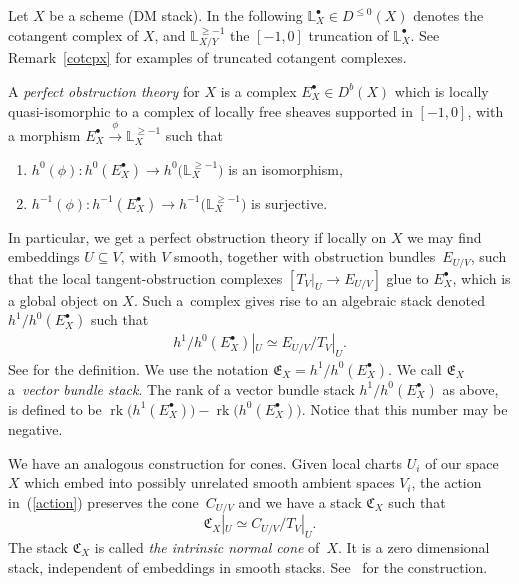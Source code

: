 \documentclass[pdftex]{sigma}
\numberwithin{equation}{section}
\newcommand{\E}{\mathfrak E}
\newcommand{\rk}{\operatorname{rk}}
\begin{document}
Let $X$ be a scheme (DM stack). In the following $\mathbb L^\bullet_{X}\in D^{\leq 0}(X)$ denotes the cotangent complex of $X$, and $\mathbb L^{\geq -1}_{X/Y}$ the $[-1,0]$ truncation of $\mathbb L^\bullet_{X}$. See Remark~\ref{cotcpx} for examples of truncated cotangent complexes.

\begin{Definition}\label{bfobs}
A \textit{perfect obstruction theory} for $X$ is a complex $E^{\bullet}_{X}\in D^{b}(X)$ which is locally quasi-isomorphic to a complex of locally free sheaves supported in $[-1, 0]$, with a morphism $E^{\bullet}_{X}\xrightarrow{\phi}\mathbb L^{\geq -1}_{X} $ such that
 \begin{enumerate}\itemsep=0pt
 \item[1)] $h^0(\phi)\colon h^0(E^{\bullet}_{X})\to h^0\big(\mathbb L^{\geq -1}_{X}\big)$ is an isomorphism,
 \item[2)] $h^{-1}(\phi)\colon h^{-1}(E^{\bullet}_{X})\to h^{-1}\big(\mathbb L^{\geq -1}_{X}\big)$ is surjective.
\end{enumerate}
 \end{Definition}
In particular, we get a perfect obstruction theory if locally on $X$ we may find embeddings $U\subseteq V$, with $V$ smooth, together with obstruction bundles~$E_{U/V}$, such that the local tangent-obstruction complexes $[T_V|_U\to E_{U/V}]$ glue to $E^{\bullet}_{X}$, which is a global object on $X$. Such a~complex gives rise to an algebraic stack denoted $h^1/h^0(E^{\bullet}_{X})$ such that \begin{gather*}h^1/h^0(E^{\bullet}_{X})|_U\simeq E_{U/V}/T_V|_U.\end{gather*} See \cite[Section~2]{BerFan} for the definition. We use the notation $\mathfrak{E}_X=h^1/h^0(E^{\bullet}_{X})$. We call $\E_X$ a~\emph{vector bundle stack}. The rank of a vector bundle stack $h^1/h^0(E^{\bullet}_{X})$ as above, is defined to be $\rk\big(h^1(E^{\bullet}_{X})\big)-\rk\big(h^0(E^{\bullet}_{X})\big)$. Notice that this number may be negative.

We have an analogous construction for cones. Given local charts $U_i$ of our space $X$ which embed into possibly unrelated smooth ambient spaces $V_i$, the action in~(\ref{action}) preserves the cone~$C_{U/V}$ and we have a stack $\mathfrak C_X$ such that
\[\mathfrak C_X|_U\simeq C_{U/V}/T_V|_U.
\]
The stack $\mathfrak C_X$ is called \emph{the intrinsic normal cone} of~$X$. It is a zero dimensional stack, independent of embeddings in smooth stacks. See~\cite{BerFan} for the construction.
\end{document}
